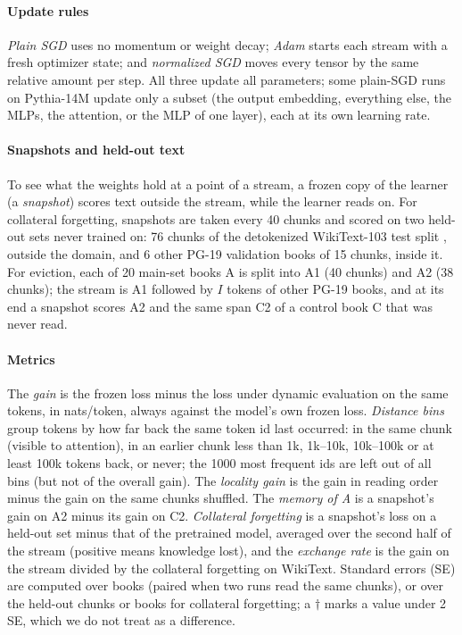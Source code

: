 \documentclass[times,twocolumn,final,authoryear]{elsarticle}
\begin{document}
\paragraph{Update rules}
\emph{Plain SGD} uses no momentum or weight decay; \emph{Adam} \citep{kingma2015adam} starts each stream with a fresh optimizer state; and \emph{normalized SGD} moves every tensor by the same relative amount per step.
All three update all parameters; some plain-SGD runs on Pythia-14M update only a subset (the output embedding, everything else, the MLPs, the attention, or the MLP of one layer), each at its own learning rate.

\paragraph{Snapshots and held-out text}
To see what the weights hold at a point of a stream, a frozen copy of the learner (a \emph{snapshot}) scores text outside the stream, while the learner reads on.
For collateral forgetting, snapshots are taken every 40 chunks and scored on two held-out sets never trained on: 76 chunks of the detokenized WikiText-103 test split \citep{merity2017pointer}, outside the domain, and 6 other PG-19 validation books of 15 chunks, inside it.
For eviction, each of 20 main-set books A is split into A1 (40 chunks) and A2 (38 chunks); the stream is A1 followed by $I$ tokens of other PG-19 books, and at its end a snapshot scores A2 and the same span C2 of a control book C that was never read.

\paragraph{Metrics}
The \emph{gain} is the frozen loss minus the loss under dynamic evaluation on the same tokens, in nats/token, always against the model's own frozen loss.
\emph{Distance bins} group tokens by how far back the same token id last occurred: in the same chunk (visible to attention), in an earlier chunk less than 1k, 1k--10k, 10k--100k or at least 100k tokens back, or never; the 1000 most frequent ids are left out of all bins (but not of the overall gain).
The \emph{locality gain} is the gain in reading order minus the gain on the same chunks shuffled.
The \emph{memory of A} is a snapshot's gain on A2 minus its gain on C2.
\emph{Collateral forgetting} is a snapshot's loss on a held-out set minus that of the pretrained model, averaged over the second half of the stream (positive means knowledge lost), and the \emph{exchange rate} is the gain on the stream divided by the collateral forgetting on WikiText.
Standard errors (SE) are computed over books (paired when two runs read the same chunks), or over the held-out chunks or books for collateral forgetting; a $\dagger$ marks a value under 2 SE, which we do not treat as a difference.
\end{document}
